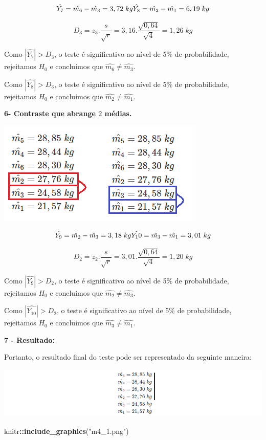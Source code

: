 \documentclass[
]{book}
\newenvironment{Shaded}{\begin{snugshade}}{\end{snugshade}}
\newcommand{\KeywordTok}[1]{\textcolor[rgb]{0.13,0.29,0.53}{\textbf{#1}}}
\newcommand{\NormalTok}[1]{#1}
\newcommand{\OperatorTok}[1]{\textcolor[rgb]{0.81,0.36,0.00}{\textbf{#1}}}
\newcommand{\StringTok}[1]{\textcolor[rgb]{0.31,0.60,0.02}{#1}}
\begin{document}
\[
\hat{Y_7} = \hat{m_6} - \hat{m_3} = 3,72\;kg \\
\hat{Y_8} = \hat{m_2} - \hat{m_1} = 6,19\;kg 
\]

\[
D_{3} = z_3.\frac{s}{\sqrt{r}} = 3,16.\frac{\sqrt{0,64}}{\sqrt{4}} = 1,26\;kg
\]

Como \(|\hat{Y_7}|>D_3\), o teste é significativo ao nível de 5\% de probabilidade, rejeitamos \(H_0\) e concluímos que \(\hat{m_6} \neq \hat{m_3}\).

Como \(|\hat{Y_8}|>D_3\), o teste é significativo ao nível de 5\% de probabilidade, rejeitamos \(H_0\) e concluímos que \(\hat{m_2} \neq \hat{m_1}\).

\textbf{6- Contraste que abrange \(2\) médias.}

\includegraphics{m2.png}

\[
\hat{Y_9} = \hat{m_2} - \hat{m_3} = 3,18\;kg \\
\hat{Y_10} = \hat{m_3} - \hat{m_1} = 3,01\;kg 
\]

\[
D_{2} = z_2.\frac{s}{\sqrt{r}} = 3,01.\frac{\sqrt{0,64}}{\sqrt{4}} = 1,20\;kg
\]

Como \(|\hat{Y_9}|>D_2\), o teste é significativo ao nível de 5\% de probabilidade, rejeitamos \(H_0\) e concluímos que \(\hat{m_2} \neq \hat{m_3}\).

Como \(|\hat{Y_10}|>D_2\), o teste é significativo ao nível de 5\% de probabilidade, rejeitamos \(H_0\) e concluímos que \(\hat{m_3} \neq \hat{m_1}\).

\textbf{7 - Resultado:}

Portanto, o resultado final do teste pode ser representado da seguinte maneira:

\includegraphics{docs//m4_1.png}

\begin{Shaded}
\begin{Highlighting}[]
\NormalTok{knitr}\OperatorTok{::}\KeywordTok{include_graphics}\NormalTok{(}\StringTok{"m4_1.png"}\NormalTok{)}
\end{Highlighting}
\end{Shaded}
\end{document}
